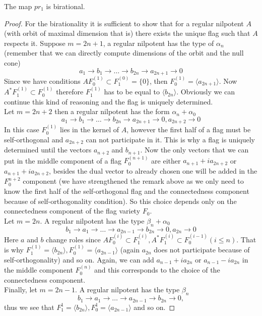 \documentclass[10pt,a4paper]{amsart}
\begin{document}
\begin{lem}
  \label{lem5}
  The map $pr_1$ is birational.
\end{lem}

\begin{proof} For the birationality it is sufficient to show that for a regular nilpotent $A$ (with orbit of maximal dimension that is) there exists the unique flag such that $A$ respects it. Suppose $m=2n+1$, a regular nilpotent has the type of $\alpha_n$ (remember that we can directly compute dimensions of the orbit and the null cone)
\begin{equation}
    a_1\rightarrow b_1 \rightarrow \dots \rightarrow b_{2n} \rightarrow a_{2n+1} \rightarrow 0
\end{equation}
Since we have conditions $AF_0^{(1)}\subset F_1^{(0)}=\{0\}$, then $F_0^{(1)} = \langle a_{2n+1} \rangle$. Now $A^*F_1^{(1)}\subset F_0^{(1)}$ therefore $F_1^{(1)}$ has to be equal to $\langle b_{2n}\rangle$. Obviously we can continue this kind of reasoning and the flag is uniquely determined.\\
Let $m=2n+2$ then a regular nilpotent has the form $\alpha_n + \alpha_0$
\begin{equation}
    a_1\rightarrow b_1 \rightarrow \dots \rightarrow b_{2n} \rightarrow a_{2n+1} \rightarrow 0,  a_{2n+2} \rightarrow 0
\end{equation}
In this case $F_0^{(1)}$ lies in the kernel of $A$, however the first half of a flag must be self-orthogonal and $a_{2n+2}$ can not participate in it. This is why a flag is uniquely determined until the vectors $a_{n+2}$ and $b_{n+1}$. Now the only vectors that we can put in the middle component of a flag $F_0^{(n+1)}$ are either $a_{n+1}+ia_{2n+2}$ or $a_{n+1}+ia_{2n+2}$, besides the dual vector to already chosen one will be added in the $F_0^{n+2}$ component (we have strengthened the remark above as we only need to know the first half of the self-orthogonal flag and the connectedness component because of self-orthogonality condition). So this choice depends only on the connectedness component of the flag variety $F_0$.\\
Let $m=2n$. A regular nilpotent has the type $\beta_n + \alpha_0$
\begin{equation}
    b_1 \rightarrow a_1 \rightarrow \dots \rightarrow a_{2n-1} \rightarrow b_{2n} \rightarrow 0, a_{2n} \rightarrow 0
\end{equation}
Here $a$ and $b$ change roles since $AF_0^{(i)} \subset F_1^{(i)},A^*F_1^{(i)} \subset F_0^{(i-1)}(i\le n)$. That is why $F_1^{(1)}=\langle b_{2n}\rangle, F_0^{(1)}=\langle a_{2n-1}\rangle$ (again $a_{2n}$ does not participate because of self-orthogonality) and so on. Again, we can add $a_{n-1}+ia_{2n}$ or $a_{n-1}-ia_{2n}$ in the middle component $F_0^{(n)}$ and this corresponds to the choice of the connectedness component.\\
Finally, let $m=2n-1$. A regular nilpotent has the type $\beta_n$
\begin{equation}
    b_1 \rightarrow a_1 \rightarrow \dots \rightarrow a_{2n-1} \rightarrow b_{2n} \rightarrow 0,
\end{equation}
thus we see that $F_{1}^{1}= \langle b_{2n}\rangle, F_{0}^{1}=\langle a_{2n-1} \rangle$ and so on.
\end{proof}
\end{document}
